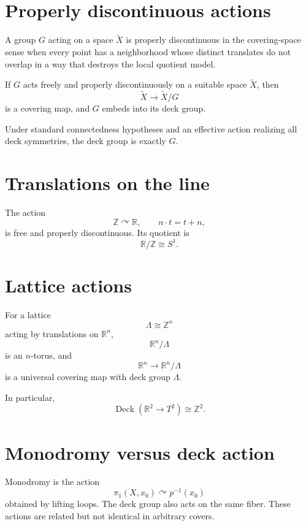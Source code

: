 \section{Properly discontinuous actions}

A group \(G\) acting on a space \(\widetilde X\) is properly discontinuous in
the covering-space sense when every point has a neighborhood whose distinct
translates do not overlap in a way that destroys the local quotient model.

\begin{theorem}
\label{thm:viii12-quotient-cover}
If \(G\) acts freely and properly discontinuously on a suitable space
\(\widetilde X\), then
\[
\widetilde X\to\widetilde X/G
\]
is a covering map, and \(G\) embeds into its deck group.
\end{theorem}

Under standard connectedness hypotheses and an effective action realizing all
deck symmetries, the deck group is exactly \(G\).

\section{Translations on the line}

The action
\[
\mathbb Z\curvearrowright\mathbb R,
\qquad
n\cdot t=t+n,
\]
is free and properly discontinuous.  Its quotient is
\[
\mathbb R/\mathbb Z\cong S^1.
\]

\section{Lattice actions}

For a lattice
\[
\Lambda\cong\mathbb Z^n
\]
acting by translations on \(\mathbb R^n\),
\[
\mathbb R^n/\Lambda
\]
is an \(n\)-torus, and
\[
\mathbb R^n\to\mathbb R^n/\Lambda
\]
is a universal covering map with deck group \(\Lambda\).

In particular,
\[
\operatorname{Deck}(\mathbb R^2\to T^2)\cong\mathbb Z^2.
\]

\section{Monodromy versus deck action}

Monodromy is the action
\[
\pi_1(X,x_0)\curvearrowright p^{-1}(x_0)
\]
obtained by lifting loops.  The deck group also acts on the same fiber.  These
actions are related but not identical in arbitrary covers.


